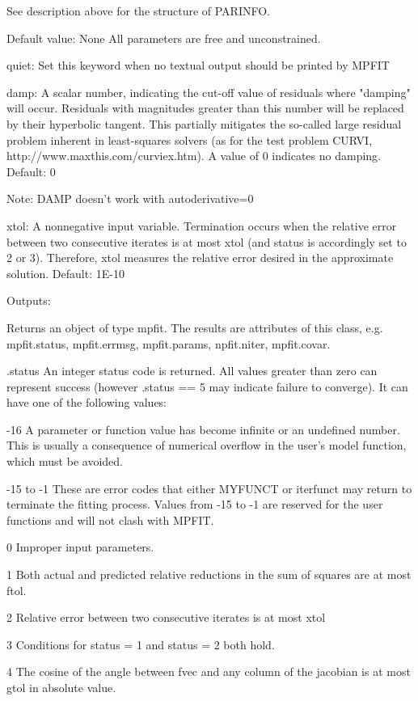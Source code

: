 \begin{DoxyVerb}
See description above for the structure of PARINFO.

Default value: None  All parameters are free and unconstrained.

     quiet:
Set this keyword when no textual output should be printed by MPFIT

     damp:
A scalar number, indicating the cut-off value of residuals where
"damping" will occur.  Residuals with magnitudes greater than this
number will be replaced by their hyperbolic tangent.  This partially
mitigates the so-called large residual problem inherent in
least-squares solvers (as for the test problem CURVI,
http://www.maxthis.com/curviex.htm).
A value of 0 indicates no damping.
   Default: 0

Note: DAMP doesn't work with autoderivative=0

     xtol:
A nonnegative input variable. Termination occurs when the relative error
between two consecutive iterates is at most xtol (and status is
accordingly set to 2 or 3).  Therefore, xtol measures the relative error
desired in the approximate solution.
Default: 1E-10

   Outputs:

     Returns an object of type mpfit.  The results are attributes of this class,
     e.g. mpfit.status, mpfit.errmsg, mpfit.params, npfit.niter, mpfit.covar.

     .status
An integer status code is returned.  All values greater than zero can
represent success (however .status == 5 may indicate failure to
converge). It can have one of the following values:

-16
   A parameter or function value has become infinite or an undefined
   number.  This is usually a consequence of numerical overflow in the
   user's model function, which must be avoided.

-15 to -1
   These are error codes that either MYFUNCT or iterfunct may return to
   terminate the fitting process.  Values from -15 to -1 are reserved
   for the user functions and will not clash with MPFIT.

0  Improper input parameters.

1  Both actual and predicted relative reductions in the sum of squares
   are at most ftol.

2  Relative error between two consecutive iterates is at most xtol

3  Conditions for status = 1 and status = 2 both hold.

4  The cosine of the angle between fvec and any column of the jacobian
   is at most gtol in absolute value.


\end{DoxyVerb}
